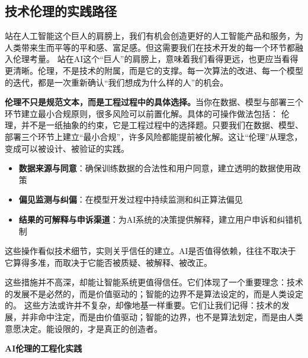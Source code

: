 \subsection{技术伦理的实践路径}

站在人工智能这个巨人的肩膀上，我们有机会创造更好的人工智能产品和服务，为人类带来生而平等的平和感、富足感。但这需要我们在技术开发的每一个环节都融入伦理考量。
站在AI这个“巨人”的肩膀上，意味着我们看得更远，也更应当看得更清晰。伦理，不是技术的附属，而是它的支撑。每一次算法的改进、每一个模型的迭代，都是一次重新确认“我们想成为什么样的人”的机会。

{\bf 伦理不只是规范文本，而是工程过程中的具体选择。}当你在数据、模型与部署三个环节建立最小合规原则，很多风险可以前置化解。具体的可操作做法包括：
伦理，并不是一纸抽象的约束，它是工程过程中的选择题。只要我们在数据、模型、部署三个环节上建立“最小合规”，许多风险都能提前被化解。这让“伦理”从理念，变成可以被设计、被验证的实践。

\begin{itemize}
\item {\bf 数据来源与同意}：确保训练数据的合法性和用户同意，建立透明的数据使用政策
\item {\bf 偏见监测与纠偏}：在模型开发过程中持续监测和纠正算法偏见
\item {\bf 结果的可解释与申诉渠道}：为AI系统的决策提供解释，建立用户申诉和纠错机制
\end{itemize}
这些操作看似技术细节，实则关乎信任的建立。AI是否值得依赖，往往不取决于它算得多准，而取决于它能否被质疑、被解释、被改正。

这些措施并不高深，却能让智能系统更值得信任。它们体现了一个重要理念：技术的发展不是必然的，而是价值驱动的；智能的边界不是算法设定的，而是人类设定的。
这些方法或许并不复杂，却像地基一样重要。它们让我们记得：技术的发展，并非命中注定，而是由价值驱动；智能的边界，也不是算法划定，而是由人类意愿决定。能设限的，才是真正的创造者。

{\bf AI伦理的工程化实践}

